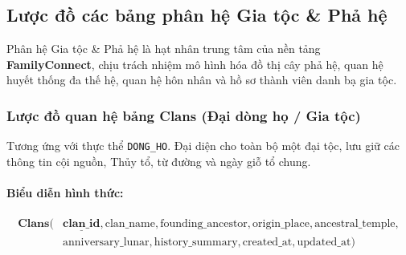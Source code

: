 \subsection{Lược đồ các bảng phân hệ Gia tộc \& Phả hệ}
\label{subsec:luoc_do_genealogy}

Phân hệ Gia tộc \& Phả hệ là hạt nhân trung tâm của nền tảng \textbf{FamilyConnect}, chịu trách nhiệm mô hình hóa đồ thị cây phả hệ, quan hệ huyết thống đa thế hệ, quan hệ hôn nhân và hồ sơ thành viên danh bạ gia tộc.

\subsubsection{Lược đồ quan hệ bảng Clans (Đại dòng họ / Gia tộc)}
Tương ứng với thực thể \texttt{DONG\_HO}. Đại diện cho toàn bộ một đại tộc, lưu giữ các thông tin cội nguồn, Thủy tổ, từ đường và ngày giỗ tổ chung.

\paragraph{Biểu diễn hình thức:}
\[
\begin{aligned}
\textbf{Clans}\big(
&\underline{\textbf{clan\_id}}, \text{clan\_name}, \text{founding\_ancestor}, \text{origin\_place}, \text{ancestral\_temple}, \\
&\text{anniversary\_lunar}, \text{history\_summary}, \text{created\_at}, \text{updated\_at}
\big)
\end{aligned}
\]

